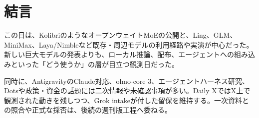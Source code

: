 \section*{結言}
この日は、KolibriのようなオープンウェイトMoEの公開と、Ling、GLM、MiniMax、Laya/Nimbleなど既存・周辺モデルの利用経路や実演が中心だった。新しい巨大モデルの発表よりも、ローカル推論、配布、エージェントへの組み込みといった「どう使うか」の層が目立つ観測日だった。

同時に、AntigravityのClaude対応、olmo-core 3、エージェントハーネス研究、Dotsや政策・資金の話題には二次情報や未確認事項が多い。Daily XではX上で観測された動きを残しつつ、Grok intakeが付した留保を維持する。一次資料との照合や正式な採否は、後続の週刊版工程へ委ねる。
